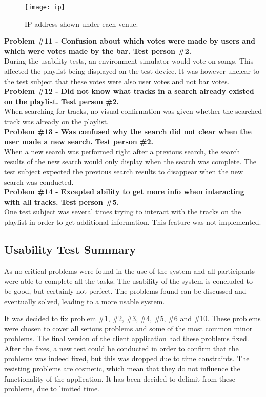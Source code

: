 \begin{figure}[hbtp]
  \centering
  \texttt{[image: ip]}
  \caption{IP-address shown under each venue.}\label{fig:ip}
\end{figure}

\noindent\textbf{Problem \#11 - Confusion about which votes were made by users and which were
    votes made by the bar. Test person \#2.}\\
  During the usability tests, an environment simulator would vote on
  songs. This affected the playlist being displayed on the test
  device. It was however unclear to the test subject that these votes
  were also user votes and not bar votes.\\

\noindent\textbf{Problem \#12 - Did not know what tracks in a search already existed on the
    playlist. Test person \#2.}\\
  When searching for tracks, no visual confirmation was given whether
  the searched track was already on the playlist.\\

\noindent\textbf{Problem \#13 - Was confused why the search did not
  clear when the user made a new search. Test person \#2.}\\
  When a new search was performed right after a previous search, the
  search results of the new search would only display when the search
  was complete. The test subject expected the previous search results
  to disappear when the new search was conducted.\\

\noindent\textbf{Problem \#14 - Excepted ability to get more info when interacting with all
    tracks. Test person \#5.}\\
  One test subject was several times trying to interact with the
  tracks on the playlist in order to get additional information. This
  feature was not implemented.

\subsection{Usability Test Summary}
As no critical problems were found in the use of the system and all participants were able to complete all the tasks. The usability of the system is concluded to be good, but certainly not perfect. The problems found can be discussed and eventually solved, leading to a more usable system.

It was decided to fix problem \#1, \#2, \#3, \#4, \#5, \#6 and
\#10. These problems were chosen to cover all serious problems and
some of the most common minor problems. The final version of the
client application had these problems fixed. After the fixes, a new test
could be conducted in order to confirm that the problems was indeed
fixed, but this was dropped due to time constraints. The resisting problems are cosmetic, which mean that they do not influence the functionality of the application. It has been decided to delimit from these problems, due to limited time.

